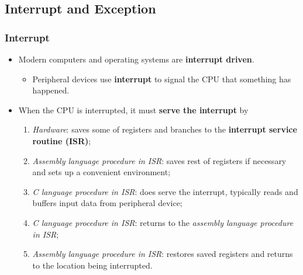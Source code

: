 \documentclass[CJKutf8,dvipsnames,table]{beamer}
\begin{document}
\begin{CJK*}{UTF8}{song}
  \subsection{Interrupt and Exception}

  \begin{frame}
    \frametitle{Interrupt} \pause
    \begin{itemize}
    \item Modern computers and operating systems are \textbf{interrupt driven}.  \pause
      \begin{itemize}
      \item Peripheral devices use \textbf{interrupt} to signal the CPU that something has happened.  \pause
      \end{itemize}
    \item When the CPU is interrupted, it must \textbf{serve the interrupt} by  \pause
      \begin{enumerate}
      \item \emph{Hardware}: saves some of registers and branches to the \textbf{interrupt service routine (ISR)};  \pause
      \item \emph{Assembly language procedure in ISR}: saves rest of registers if necessary and sets up a convenient environment;  \pause
      \item \emph{C language procedure in ISR}: does serve the interrupt, typically reads and buffers input data from peripheral device;  \pause
      \item \emph{C language procedure in ISR}: returns to the \emph{assembly language procedure in ISR};  \pause
      \item \emph{Assembly language procedure in ISR}: restores saved registers and returns to the location being interrupted.  
      \end{enumerate}
    \end{itemize}
  \end{frame}


\end{CJK*}
\end{document}
